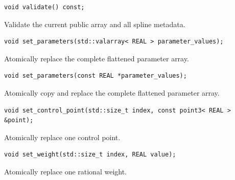 \par\noindent\begin{minipage}{\linewidth}
\begin{lstlisting}[style=apireference]
void validate() const;
\end{lstlisting}
{\footnotesize Validate the current public array and all spline metadata.\par}
\end{minipage}\par\vspace{1pt}
\par\noindent\begin{minipage}{\linewidth}
\begin{lstlisting}[style=apireference]
void set_parameters(std::valarray< REAL > parameter_values);
\end{lstlisting}
{\footnotesize Atomically replace the complete flattened parameter array.\par}
\end{minipage}\par\vspace{1pt}
\par\noindent\begin{minipage}{\linewidth}
\begin{lstlisting}[style=apireference]
void set_parameters(const REAL *parameter_values);
\end{lstlisting}
{\footnotesize Atomically copy and replace the complete flattened parameter array.\par}
\end{minipage}\par\vspace{1pt}
\par\noindent\begin{minipage}{\linewidth}
\begin{lstlisting}[style=apireference]
void set_control_point(std::size_t index, const point3< REAL > &point);
\end{lstlisting}
{\footnotesize Atomically replace one control point.\par}
\end{minipage}\par\vspace{1pt}
\par\noindent\begin{minipage}{\linewidth}
\begin{lstlisting}[style=apireference]
void set_weight(std::size_t index, REAL value);
\end{lstlisting}
{\footnotesize Atomically replace one rational weight.\par}
\end{minipage}\par\vspace{1pt}
